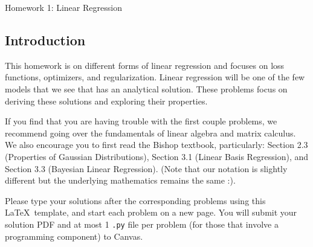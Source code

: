 \documentclass[submit]{harvardml}
\begin{document}
\begin{center}
{\Large Homework 1: Linear Regression}\\
\end{center}



\subsection*{Introduction}
This homework is on different forms of linear regression and focuses
on loss functions, optimizers, and regularization. Linear regression
will be one of the few models that we see that has an analytical solution.
These problems focus on deriving these solutions and exploring their
properties.

If you find that you are having trouble with the first couple
problems, we recommend going over the fundamentals of linear algebra
and matrix calculus. We also encourage you to first read the Bishop
textbook, particularly: Section 2.3 (Properties of Gaussian
Distributions), Section 3.1 (Linear Basis Regression), and Section 3.3
(Bayesian Linear Regression). (Note that our notation is slightly different but
the underlying mathematics remains the same :).

Please type your solutions after the corresponding problems using this \LaTeX\ template, and start each problem on a new page. You will submit your solution PDF and at most 1 \texttt{.py} file per problem
(for those that involve a programming component) to Canvas.\\

\pagebreak
\end{document}
